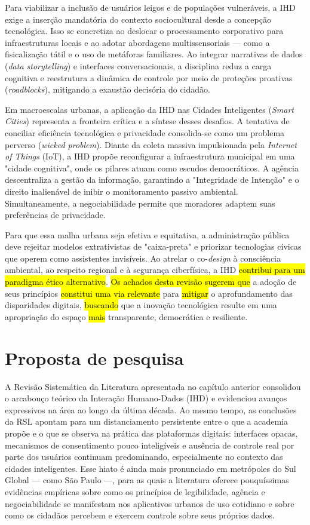 \documentclass[
	12pt,				%
	oneside,			%
	a4paper,			%
	english,			%
	brazil				%
	]{abntex2ppgsi}
\begin{document}
    Para viabilizar a inclusão de usuários leigos e de populações vulneráveis, a IHD exige a inserção mandatória do contexto sociocultural desde a concepção tecnológica. Isso se concretiza ao deslocar o processamento corporativo para infraestruturas locais e ao adotar abordagens multissensoriais — como a fisicalização tátil e o uso de metáforas familiares. Ao integrar narrativas de dados (\textit{data storytelling}) e interfaces conversacionais, a disciplina reduz a carga cognitiva e reestrutura a dinâmica de controle por meio de proteções proativas (\textit{roadblocks}), mitigando a exaustão decisória do cidadão.

    Em macroescalas urbanas, a aplicação da IHD nas Cidades Inteligentes (\textit{Smart Cities}) representa a fronteira crítica e a síntese desses desafios. A tentativa de conciliar eficiência tecnológica e privacidade consolida-se como um problema perverso (\textit{wicked problem}). Diante da coleta massiva impulsionada pela \textit{Internet of Things} (IoT), a IHD propõe reconfigurar a infraestrutura municipal em uma "cidade cognitiva", onde os pilares atuam como escudos democráticos. A agência descentraliza a gestão da informação, garantindo a "Integridade de Intenção" e o direito inalienável de inibir o monitoramento passivo ambiental. Simultaneamente, a negociabilidade permite que moradores adaptem suas preferências de privacidade.

    Para que essa malha urbana seja efetiva e equitativa, a administração pública deve rejeitar modelos extrativistas de "caixa-preta" e priorizar tecnologias cívicas que operem como assistentes invisíveis. Ao atrelar o co-\textit{design} à consciência ambiental, ao respeito regional e à segurança ciberfísica, a IHD \hl{contribui para um paradigma ético alternativo}. \hl{Os achados desta revisão sugerem que} a adoção de seus princípios \hl{constitui uma via relevante} para \hl{mitigar} o aprofundamento das disparidades digitais, \hl{buscando} que a inovação tecnológica resulte em uma apropriação do espaço \hl{mais} transparente, democrática e resiliente.
    
\chapter{Proposta de pesquisa}\label{cap:proposta}

    A Revisão Sistemática da Literatura apresentada no capítulo anterior consolidou o arcabouço teórico da Interação Humano-Dados (IHD) e evidenciou avanços expressivos na área ao longo da última década. Ao mesmo tempo, as conclusões da RSL apontam para um distanciamento persistente entre o que a academia propõe e o que se observa na prática das plataformas digitais: interfaces opacas, mecanismos de consentimento pouco inteligíveis e ausência de controle real por parte dos usuários continuam predominando, especialmente no contexto das cidades inteligentes. Esse hiato é ainda mais pronunciado em metrópoles do Sul Global — como São Paulo —, para as quais a literatura oferece pouquíssimas evidências empíricas sobre como os princípios de legibilidade, agência e negociabilidade se manifestam nos aplicativos urbanos de uso cotidiano e sobre como os cidadãos percebem e exercem controle sobre seus próprios dados.
    
\end{document}
